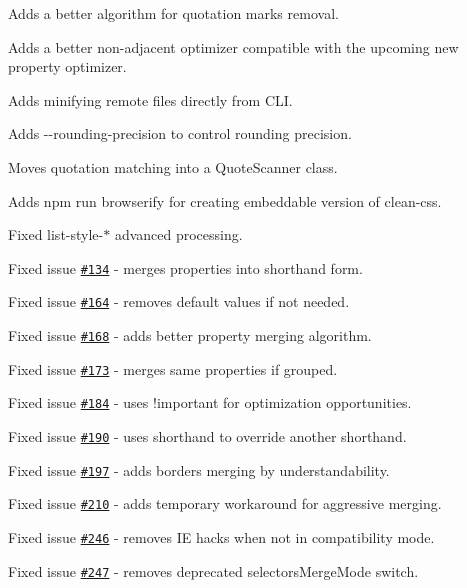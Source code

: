 \begin{DoxyItemize}
\item Adds a better algorithm for quotation marks\textquotesingle{} removal.
\item Adds a better non-\/adjacent optimizer compatible with the upcoming new property optimizer.
\item Adds minifying remote files directly from C\+LI.
\item Adds {\ttfamily -\/-\/rounding-\/precision} to control rounding precision.
\item Moves quotation matching into a {\ttfamily Quote\+Scanner} class.
\item Adds {\ttfamily npm run browserify} for creating embeddable version of clean-\/css.
\item Fixed list-\/style-\/$\ast$ advanced processing.
\item Fixed issue \href{https://github.com/jakubpawlowicz/clean-css/issues/134}{\tt \#134} -\/ merges properties into shorthand form.
\item Fixed issue \href{https://github.com/jakubpawlowicz/clean-css/issues/164}{\tt \#164} -\/ removes default values if not needed.
\item Fixed issue \href{https://github.com/jakubpawlowicz/clean-css/issues/168}{\tt \#168} -\/ adds better property merging algorithm.
\item Fixed issue \href{https://github.com/jakubpawlowicz/clean-css/issues/173}{\tt \#173} -\/ merges same properties if grouped.
\item Fixed issue \href{https://github.com/jakubpawlowicz/clean-css/issues/184}{\tt \#184} -\/ uses {\ttfamily !important} for optimization opportunities.
\item Fixed issue \href{https://github.com/jakubpawlowicz/clean-css/issues/190}{\tt \#190} -\/ uses shorthand to override another shorthand.
\item Fixed issue \href{https://github.com/jakubpawlowicz/clean-css/issues/197}{\tt \#197} -\/ adds borders merging by understandability.
\item Fixed issue \href{https://github.com/jakubpawlowicz/clean-css/issues/210}{\tt \#210} -\/ adds temporary workaround for aggressive merging.
\item Fixed issue \href{https://github.com/jakubpawlowicz/clean-css/issues/246}{\tt \#246} -\/ removes IE hacks when not in compatibility mode.
\item Fixed issue \href{https://github.com/jakubpawlowicz/clean-css/issues/247}{\tt \#247} -\/ removes deprecated {\ttfamily selectors\+Merge\+Mode} switch.

\end{DoxyItemize}
